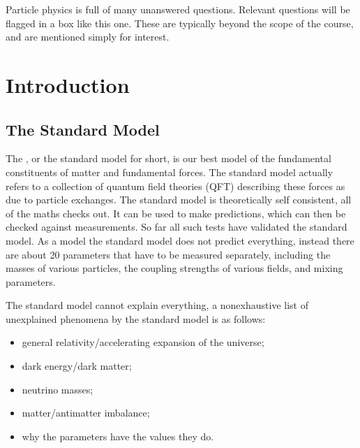 \documentclass[fleqn]{NotesClass}
\begin{document}
    \begin{openquestion}{}{}
        Particle physics is full of many unanswered questions.
        Relevant questions will be flagged in a box like this one.
        These are typically beyond the scope of the course, and are mentioned simply for interest.
    \end{openquestion}
        
    \chapter{Introduction}
    \section{The Standard Model}
    The , or the standard model for short, is our best model of the fundamental constituents of matter and fundamental forces.
    The standard model actually refers to a collection of quantum field theories (QFT) describing these forces as due to particle exchanges.
    The standard model is theoretically self consistent, all of the maths checks out.
    It can be used to make predictions, which can then be checked against measurements.
    So far all such tests have validated the standard model.
    As a model the standard model does not predict everything, instead there are about 20 parameters that have to be measured separately, including the masses of various particles, the coupling strengths of various fields, and mixing parameters.
    
    The standard model cannot explain everything, a nonexhaustive list of unexplained phenomena by the standard model is as follows:
    \begin{itemize}
        \item general relativity/accelerating expansion of the universe;
        \item dark energy/dark matter;
        \item neutrino masses;
        \item matter/antimatter imbalance;
        \item why the parameters have the values they do.
    \end{itemize}
    
\end{document}

